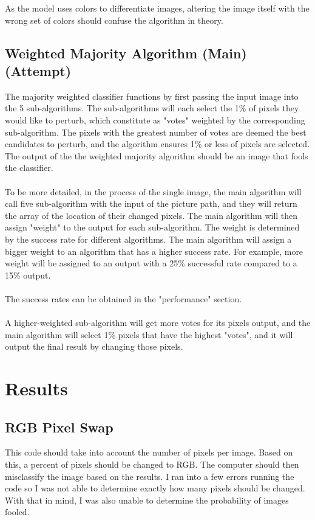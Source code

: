 \documentclass{article}
\begin{document}
As the model uses colors to differentiate images, altering the image itself with the wrong set of colors should confuse the algorithm in theory.

\subsection{Weighted Majority Algorithm (Main) (Attempt)}
The majority weighted classifier functions by first passing the input image into the 5 sub-algorithms. The sub-algorithms will each select the 1\% of pixels they would like to perturb, which constitute as "votes" weighted by the corresponding sub-algorithm. The pixels with the greatest number of votes are deemed the best candidates to perturb, and the algorithm ensures 1\% or less of pixels are selected. The output of the the weighted majority algorithm should be an image that fools the classifier.
\\
\\
To be more detailed, in the process of the single image, the main algorithm will call five sub-algorithm with the input of the picture path, and they will return the array of the location of their changed pixels. The main algorithm will then assign "weight" to the output for each sub-algorithm. The weight is determined by the success rate for different algorithms. The main algorithm will assign a bigger weight to an algorithm that has a higher success rate. For example, more weight will be assigned to an output with a 25\% successful rate compared to a 15\% output.    
\\
\\
The success rates can be obtained in the "performance" section.
\\
\\
A higher-weighted sub-algorithm will get more votes for its pixels output, and the main algorithm will select 1\% pixels that have the highest "votes", and it will output the final result by changing those pixels. 

\section{Results}
\subsection{RGB Pixel Swap}
This code should take into account the number of pixels per image. Based on this, a percent of pixels should be changed to RGB. The computer should then misclassify the image based on the results. I ran into a few errors running the code so I was not able to determine exactly how many pixels should be changed. With that in mind, I was also unable to determine the probability of images fooled. 
\end{document}
